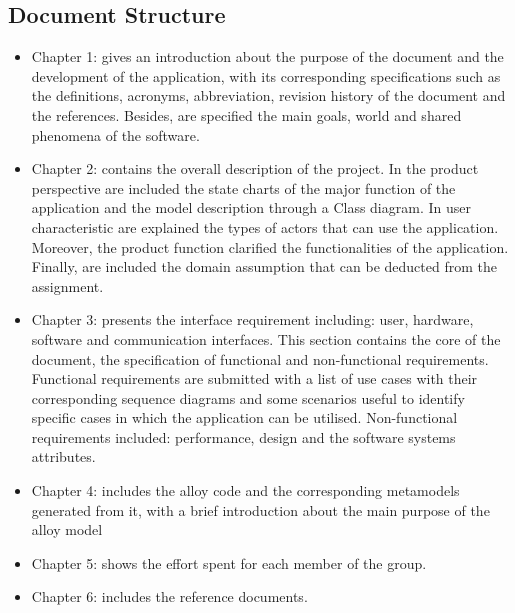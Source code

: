 \subsection{Document Structure}
\begin{itemize}
	\item Chapter 1: gives an introduction about the purpose of the document and the development of the application, with its corresponding specifications such as the definitions, acronyms, abbreviation,	revision history of the document and the references. Besides, are specified the main goals, world and shared phenomena of the software.
	\item Chapter 2: contains the overall description of the project. In the product perspective are included the state charts of the major function of the application and the model description through a Class diagram. In user characteristic are explained the types of actors that can use the application.
	Moreover, the product function clarified the functionalities of the application. Finally, are included the domain assumption that can be deducted from the assignment.
	\item Chapter 3: presents the interface requirement including: user, hardware, software and communication interfaces. This section contains the core of the document, the specification of functional and non-functional requirements. Functional requirements are submitted with a list of use cases with their corresponding sequence diagrams and some scenarios useful to identify specific cases in which the application can be utilised. Non-functional requirements included: performance, design and the software systems attributes.
	\item Chapter 4: includes the alloy code and the corresponding metamodels generated from it, with a brief introduction about the main purpose of the alloy model
	\item Chapter 5: shows the effort spent for each member of the group.
	\item Chapter 6: includes the reference documents.
\end{itemize}

